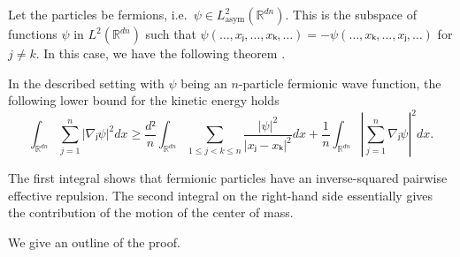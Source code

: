 Let the particles be fermions, i.e.\ $ψ ∈ L_\text{asym}^2(ℝ^{dn})$. This is the subspace of functions $ψ$ in $L^2(ℝ^{dn})$ such that $ψ(…, xⱼ, …, xₖ, …) = - ψ(…, xₖ, …, xⱼ, …)$ for $j \ne k$. In this case, we have the following theorem \cite{hoholt,methmmp}.

\begin{theorem}\label{thm:hardy fermion}
  In the described setting with $ψ$ being an $n$-particle fermionic wave function, the following lower bound for the kinetic energy holds
  \begin{equation}\label{eq:fermion ineq}
    ∫_{ℝ^{dn}} ∑_{j=1}^n |∇ⱼψ|^2 dx \ge
    \frac{d²}{n} ∫_{ℝ^{dn}} ∑_{1≤j<k≤n} \frac{|ψ|^2}{|xⱼ-xₖ|^2} dx +
    \frac{1}{n} ∫_{ℝ^{dn}} \left|∑_{j=1}^n ∇ⱼ ψ \right|^2 dx.
  \end{equation}
\end{theorem}

The first integral shows that fermionic particles have an inverse-squared pairwise effective repulsion. The second integral on the right-hand side essentially gives the contribution of the motion of the center of mass.

We give an outline of the proof.

